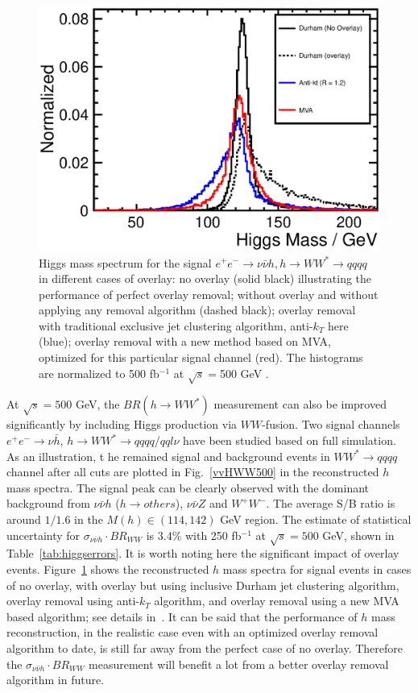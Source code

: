 \begin{figure}
\begin{center}
\includegraphics[width=0.85\hsize]{chapters/figures/vvH_WW4j500_Overlay.eps}
\end{center}
  \caption{Higgs mass spectrum for the signal $e^+e^-\to\nu\bar\nu h, h\to WW^{*}\to qqqq$
   in different cases of overlay: no overlay (solid black) 
  illustrating the performance of perfect overlay removal; without overlay and without
  applying any removal algorithm (dashed black); overlay removal with traditional 
  exclusive jet clustering algorithm, anti-$k_T$ here (blue); overlay removal with a new
  method based on MVA, optimized for this particular signal channel (red). The histograms 
  are normalized to 500 fb$^{-1}$ at $\sqrt{s}=$500 GeV \cite{Durig:2014lfa}.}
  \label{fig:vvHWW500ovl}
\end{figure}

At $\sqrt{s}=500$ GeV, the $BR(h\to WW^*)$ measurement can also be improved significantly by including 
Higgs production via $WW$-fusion. Two signal channels $e^+e^-\to\nu\bar{h}$, $h\to WW^*\to qqqq / qql\nu$
have been studied based on full simulation. As an illustration, t
he remained signal and background events in $WW^*\to qqqq$ channel
after all cuts are plotted in Fig.~\ref{vvHWW500} in the reconstructed $h$ mass spectra. The signal peak
can be clearly observed with the dominant background from $\nu\bar{\nu}h$ ($h\to others$), 
$\nu\bar{\nu}Z$ and $W^+W^-$. The average S/B ratio is around $1/1.6$ in the $M(h)\in(114,142)$ GeV 
region. The estimate of statistical uncertainty for $\sigma_{\nu\bar{\nu}h}\cdot BR_{WW}$ is
3.4\% with 250 fb$^{-1}$ at $\sqrt{s}=500$ GeV, shown in Table~\ref{tab:higgserrors}.
It is worth noting here the significant impact of overlay events. Figure~\ref{fig:vvHWW500ovl} 
shows the reconstructed $h$ mass spectra for signal events in cases of no overlay, with overlay but using
inclusive Durham jet clustering algorithm, overlay removal using anti-$k_T$ algorithm, and overlay
removal using a new MVA based algorithm; see details in~\cite{Durig:2014lfa}. 
It can be said that the performance of $h$ mass reconstruction,
in the realistic case even with an optimized overlay removal algorithm to date, is still far away from the 
perfect case of no overlay. Therefore the $\sigma_{\nu\bar{\nu}h}\cdot BR_{WW}$ measurement will 
benefit a lot from a better overlay removal algorithm in future.

